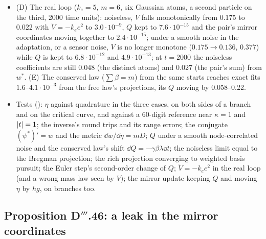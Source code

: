 \begin{itemize}
    step's exact mean change is the closed form's to 0.029--0.036\% at $h = 0.005$. Along D$'''$.44's reduced flow from
    the lazy projection $\norm w_1$ first rises, then $Q$'s mean falls to $-0.021$ by its time $s = 10^8$ (no atom yet
    extinct): the state ends on basis pursuit where it is the truth (6 instances), elsewhere on its support (two) or on
    another sparse fit of larger $\ell^1$ norm (two). At $h = 0.5$ the paradigm's Euler update lowers $Q$ by 0.34--0.36
    and moves the projection by 0.030--0.043, as the reduced flow does; the mirror update keeps it to $9.0\cdot10^{-12}$.
  \item (D) The real loop ($k_e = 5$, $m = 6$, six Gaussian atoms, a second particle on the third, 2000 time units):
    noiseless, $V$ falls monotonically from 0.175 to 0.022 with $\dot V = -k_ee^2$ to $3.0\cdot10^{-9}$, $Q$ kept to
    $7.6\cdot10^{-15}$ and the pair's mirror coordinates moving together to $2.4\cdot10^{-15}$; under a smooth noise in
    the adaptation, or a sensor noise, $V$ is no longer monotone ($0.175\to0.136$, 0.377) while $Q$ is kept to
    $6.8\cdot10^{-12}$ and $4.9\cdot10^{-13}$; at $t = 2000$ the noiseless coefficients are still 0.048 (the distinct
    atoms) and 0.027 (the pair's sum) from $w^*$. (E) The conserved law ($\sum\beta = m$) from the same starts reaches
    exact fits $1.6$--$4.1\cdot10^{-3}$ from the free law's projections, its $Q$ moving by 0.058--0.22.
  \item Tests (): $\eta$ against quadrature in the three cases, on both sides of a branch
    and on the critical curve, and against a 60-digit reference near $\kappa = 1$ and $\lvert t\rvert = 1$; the inverse's round
    trips and its range errors; the conjugate $(\psi^*)' = w$ and the metric $\dd w/\dd\eta = mD$; $Q$ under a smooth
    node-correlated noise and the conserved law's shift $\dd Q = -\gamma\beta\lambda\dd t$; the noiseless limit equal to
    the Bregman projection; the rich projection converging to weighted basis pursuit; the Euler step's second-order change
    of $Q$; $\dot V = -k_ee^2$ in the real loop (and a wrong mass law seen by $V$); the mirror update keeping $Q$ and
    moving $\eta$ by $hg$, on branches too.
\end{itemize}

\subsection{Proposition D\texorpdfstring{$'''$}{'''}.46: a leak in the mirror coordinates}

